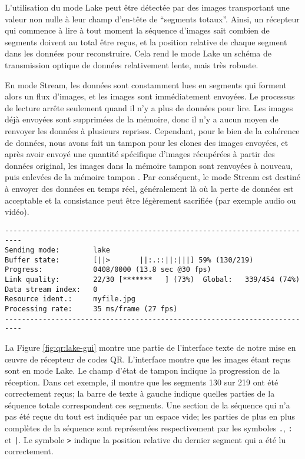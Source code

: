 L'utilisation du mode Lake peut être détectée par des images transportant une valeur non nulle à leur champ d'en-tête de ``segments totaux''. Ainsi, un récepteur qui commence à lire à tout moment la séquence d'images sait combien de segments doivent au total être reçus, et la position relative de chaque segment dans les données pour reconstruire. Cela rend le mode Lake un schéma de transmission optique de données relativement lente, mais très robuste.

En mode Stream, les données sont constamment lues en segments qui forment alors un flux d'images, et les images sont immédiatement envoyées. Le processus de lecture arrête seulement quand il n'y a plus de données pour lire. Les images déjà envoyées sont supprimées de la mémoire, donc il n'y a aucun moyen de renvoyer les données à plusieurs reprises. Cependant, pour le bien de la cohérence de données, nous avons fait un tampon pour les clones des images envoyées, et après avoir envoyé une quantité spécifique d'images récupérées à partir des données original, les images dans la mémoire tampon sont renvoyées à nouveau, puis enlevées de la mémoire tampon . Par conséquent, le mode Stream est destiné à envoyer des données en temps réel, généralement là où la perte de données est acceptable et la consistance peut être légèrement sacrifiée (par exemple audio ou vidéo).

\begin{figure*}
\centering
\begin{verbatim}
--------------------------------------------------------------------------
Sending mode:        lake
Buffer state:        [||>       ||:.::||:|||] 59% (130/219)
Progress:            0408/0000 (13.8 sec @30 fps)
Link quality:        22/30 [*******   ] (73%)  Global:   339/454 (74%)
Data stream index:   0
Resource ident.:     myfile.jpg
Processing rate:     35 ms/frame (27 fps)
--------------------------------------------------------------------------
\end{verbatim}
\caption{Une partie de l'interface texte du récepteur de codes QR qui fonctionne en mode Lake}
\label{fig:qr:lake-gui}
\end{figure*}

La Figure \ref{fig:qr:lake-gui} montre une partie de l'interface texte de notre mise en œuvre de récepteur de codes QR. L'interface montre que les images étant reçus sont en mode Lake. Le champ d'état de tampon indique la progression de la réception. Dans cet exemple, il montre que les segments 130 sur 219 ont été correctement reçus; la barre de texte à gauche indique quelles parties de la séquence totale correspondent ces segments. Une section de la séquence qui n'a pas été reçue du tout est indiquée par un espace vide; les parties de plus en plus complètes de la séquence sont représentées respectivement par les symboles \verb+.+, \verb+:+ et \verb+|+. Le symbole \verb+>+ indique la position relative du dernier segment qui a été lu correctement.

